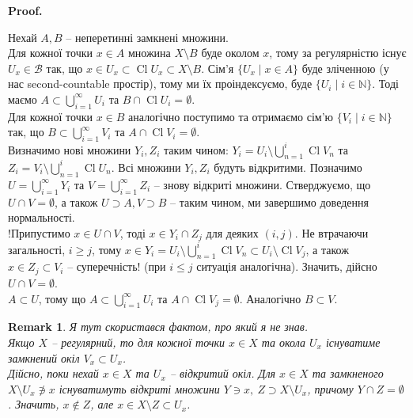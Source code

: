 \documentclass[a4paper, 10pt]{article}
\makeatletter
\theoremstyle{theoremdd}
\newtheorem{remark}[theorem]{Remark}
\DeclareMathOperator{\Cl}{Cl}
\renewenvironment{proof}[1][Proof.\\]{\par
\pushQED{\hfill \qed}%
\normalfont \topsep6\p@\@plus6\p@\relax
\trivlist
\item\relax
{\bfseries
#1\@addpunct{.}}\hspace\labelsep\ignorespaces
}{%
\popQED\endtrivlist\@endpefalse
}
\makeatother
\begin{document}
\begin{proof}
Нехай $A,B$ -- неперетинні замкнені множини. \\
Для кожної точки $x \in A$ множина $X \setminus B$ буде околом $x$, тому за регулярністю існує $U_x \in \mathcal{B}$ так, що $x \in U_x \subset \Cl U_x \subset X \setminus B$. Сім'я $\{U_x \mid x \in A\}$ буде зліченною (у нас second-countable простір), тому ми їх проіндексуємо, буде $\{U_i \mid i \in \mathbb{N}\}$. Тоді маємо $A \subset \displaystyle\bigcup_{i=1}^\infty U_i$ та $B \cap \Cl U_i = \emptyset$.\\
Для кожної точки $x \in B$ аналогічно поступимо та отримаємо сім'ю $\{V_i \mid i \in \mathbb{N}\}$ так, що $B \subset \displaystyle\bigcup_{i=1}^\infty V_i$ та $A \cap \Cl V_i = \emptyset$.\\
Визначимо нові множини $Y_i,Z_i$ таким чином: $Y_i = U_i \setminus \displaystyle\bigcup_{n=1}^i \Cl V_n$ та $Z_i = V_i \setminus \displaystyle\bigcup_{n=1}^i \Cl U_n$. Всі множини $Y_i,Z_i$ будуть відкритими. Позначимо $U = \displaystyle\bigcup_{i=1}^\infty Y_i$ та $V = \displaystyle\bigcup_{i=1}^\infty Z_i$ -- знову відкриті множини. Стверджуємо, що $U \cap V = \emptyset$, а також $U \supset A, V \supset B$ -- таким чином, ми завершимо доведення нормальності.\\
!Припустимо $x \in U \cap V$, тоді $x \in Y_i \cap Z_j$ для деяких $(i,j)$. Не втрачаючи загальності, $i \geq j$, тому $x \in Y_i = U_i \setminus \displaystyle\bigcup_{n=1}^i \Cl V_n \subset U_i \setminus \Cl V_j$, а також $x \in Z_j \subset V_i$ -- суперечність! (при $i \leq j$ ситуація аналогічна). Значить, дійсно $U \cap V = \emptyset$.\\
$A \subset U$, тому що $A \subset \displaystyle\bigcup_{i=1}^\infty U_i$ та $A \cap \Cl V_j = \emptyset$. Аналогічно $B \subset V$.
\end{proof}

\begin{remark}
Я тут скористався фактом, про який я не знав.\\
Якщо $X$ -- регулярний, то для кожної точки $x \in X$ та окола $U_x$ існуватиме замкнений окіл $V_x \subset U_x$.\\
Дійсно, поки нехай $x \in X$ та $U_x$ -- відкритий окіл. Для $x \in X$ та замкненого $X \setminus U_x \not\ni x$ існуватимуть відкриті множини $Y \ni x,\ Z \supset X \setminus U_x$, причому $Y \cap Z = \emptyset$. Значить, $x \notin Z$, але $x \in X \setminus Z \subset U_x$.
\end{remark}
\end{document}
